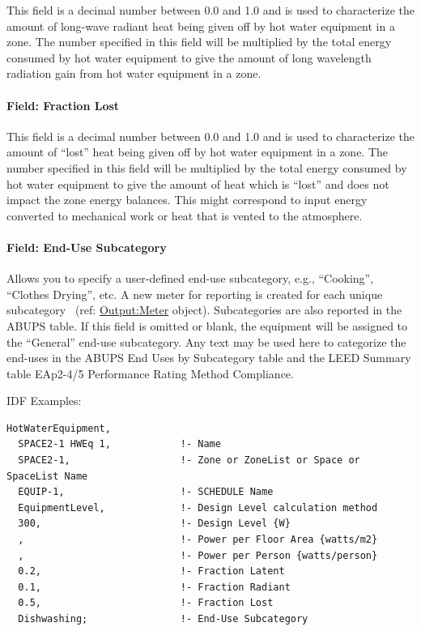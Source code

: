 This field is a decimal number between 0.0 and 1.0 and is used to characterize the amount of long-wave radiant heat being given off by hot water equipment in a zone. The number specified in this field will be multiplied by the total energy consumed by hot water equipment to give the amount of long wavelength radiation gain from hot water equipment in a zone.

\paragraph{Field: Fraction Lost}\label{field-fraction-lost-2}

This field is a decimal number between 0.0 and 1.0 and is used to characterize the amount of ``lost'' heat being given off by hot water equipment in a zone. The number specified in this field will be multiplied by the total energy consumed by hot water equipment to give the amount of heat which is ``lost'' and does not impact the zone energy balances. This might correspond to input energy converted to mechanical work or heat that is vented to the atmosphere.

\paragraph{Field: End-Use Subcategory}\label{field-end-use-subcategory-3-000}

Allows you to specify a user-defined end-use subcategory, e.g., ``Cooking'', ``Clothes Drying'', etc. A new meter for reporting is created for each unique subcategory~ (ref: \hyperref[outputmeter-and-outputmetermeterfileonly]{Output:Meter} object). Subcategories are also reported in the ABUPS table. If this field is omitted or blank, the equipment will be assigned to the ``General'' end-use subcategory. Any text may be used here to categorize the end-uses in the ABUPS End Uses by Subcategory table and the LEED Summary table EAp2-4/5 Performance Rating Method Compliance.

IDF Examples:

\begin{lstlisting}
HotWaterEquipment,
  SPACE2-1 HWEq 1,            !- Name
  SPACE2-1,                   !- Zone or ZoneList or Space or SpaceList Name
  EQUIP-1,                    !- SCHEDULE Name
  EquipmentLevel,             !- Design Level calculation method
  300,                        !- Design Level {W}
  ,                           !- Power per Floor Area {watts/m2}
  ,                           !- Power per Person {watts/person}
  0.2,                        !- Fraction Latent
  0.1,                        !- Fraction Radiant
  0.5,                        !- Fraction Lost
  Dishwashing;                !- End-Use Subcategory
\end{lstlisting}

